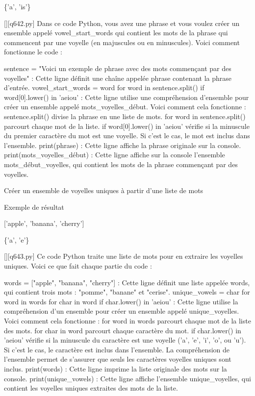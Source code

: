 \{'a', 'is'\}
        \par
        \begin{solution}
            \renewcommand{\nomfichier}{q642.py}
            \pythonfile{\chemincode \nomfichier}[][\nomfichier]
            Dans ce code Python, vous avez une phrase et vous voulez créer un ensemble appelé vowel_start_words qui contient les mots de la phrase qui commencent par une voyelle (en majuscules ou en minuscules). Voici comment fonctionne le code :

    sentence = "Voici un exemple de phrase avec des mots commençant par des voyelles" : Cette ligne définit une chaîne appelée phrase contenant la phrase d'entrée.
    vowel_start_words = {word for word in sentence.split() if word[0].lower() in 'aeiou'} : Cette ligne utilise une compréhension d'ensemble pour créer un ensemble appelé mots_voyelles_début. Voici comment cela fonctionne :
        sentence.split() divise la phrase en une liste de mots.
        for word in sentence.split() parcourt chaque mot de la liste.
        if word[0].lower() in 'aeiou' vérifie si la minuscule du premier caractère du mot est une voyelle. Si c'est le cas, le mot est inclus dans l'ensemble.
    print(phrase) : Cette ligne affiche la phrase originale sur la console.
    print(mots_voyelles_début) : Cette ligne affiche sur la console l'ensemble mots_début_voyelles, qui contient les mots de la phrase commençant par des voyelles.
        \end{solution}
        

        \question
        Créer un ensemble de voyelles uniques à partir d'une liste de mots

Exemple de résultat

['apple', 'banana', 'cherry']

\{'a', 'e'\}
        \par
        \begin{solution}
            \renewcommand{\nomfichier}{q643.py}
            \pythonfile{\chemincode \nomfichier}[][\nomfichier]
            Ce code Python traite une liste de mots pour en extraire les voyelles uniques. Voici ce que fait chaque partie du code :

    words = ["apple", "banana", "cherry"] : Cette ligne définit une liste appelée words, qui contient trois mots : "pomme", "banane" et "cerise".
    unique_vowels = {char for word in words for char in word if char.lower() in 'aeiou'} : Cette ligne utilise la compréhension d'un ensemble pour créer un ensemble appelé unique_voyelles. Voici comment cela fonctionne :
        for word in words parcourt chaque mot de la liste des mots.
        for char in word parcourt chaque caractère du mot.
        if char.lower() in 'aeiou' vérifie si la minuscule du caractère est une voyelle ('a', 'e', 'i', 'o', ou 'u'). Si c'est le cas, le caractère est inclus dans l'ensemble. La compréhension de l'ensemble permet de s'assurer que seuls les caractères voyelles uniques sont inclus.
    print(words) : Cette ligne imprime la liste originale des mots sur la console.
    print(unique_vowels) : Cette ligne affiche l'ensemble unique_voyelles, qui contient les voyelles uniques extraites des mots de la liste.
        \end{solution}
        

